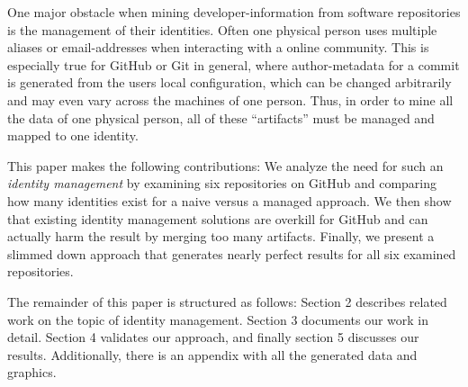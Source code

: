 One major obstacle when mining developer-information from software repositories is the management of their identities. Often one physical person uses multiple aliases or email-addresses when interacting with a online community. This is especially true for GitHub or Git in general, where author-metadata for a commit is generated from the users local configuration, which can be changed arbitrarily and may even vary across the machines of one person. Thus, in order to mine all the data of one physical person, all of these ``artifacts'' must be managed and mapped to one identity.

This paper makes the following contributions: We analyze the need for such an \emph{identity management} by examining six repositories on GitHub and comparing how many identities exist for a naive versus a managed approach. We then show that existing identity management solutions are overkill for GitHub and can actually harm the result by merging too many artifacts. Finally, we present a slimmed down approach that generates nearly perfect results for all six examined repositories.

The remainder of this paper is structured as follows: Section 2 describes related work on the topic of identity management. Section 3 documents our work in detail. Section 4 validates our approach, and finally section 5 discusses our results. Additionally, there is an appendix with all the generated data and graphics.
